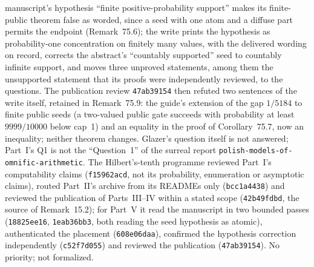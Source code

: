 \documentclass[11pt]{article}
\newcommand{\dir}[1]{\texttt{#1}}
\begin{document}
{manuscript's hypothesis ``finite positive-probability support'' makes its
finite-public theorem false as worded, since a seed with one atom and a
diffuse part permits the endpoint (Remark~75.6); the write prints the
hypothesis as probability-one concentration on finitely many values, with
the delivered wording on record, corrects the abstract's ``countably
supported'' seed to countably infinite support, and moves three unproved
statements, among them the unsupported statement that its proofs were
independently reviewed, to the questions.  The publication review \texttt{47ab39154} then refuted two
sentences of the write itself, retained in Remark~75.9: the guide's
extension of the gap $1/5184$ to finite public seeds (a two-valued public
gate succeeds with probability at least $9999/10000$ below cap~1) and an
equality in the proof of Corollary~75.7, now an inequality; neither
theorem changes.
Glazer's question itself is not answered; Part~I's Q1 is not the
``Question~1'' of the surreal report
\dir{polish-models-of-omnific-arithmetic}.  The Hilbert's-tenth programme
reviewed Part~I's computability claims (\texttt{f15962acd}, not its
probability, enumeration or asymptotic claims), routed Part~II's
archive from its READMEs only (\texttt{bcc1a4438}) and reviewed the
publication of Parts~III--IV within a stated scope (\texttt{42b49fdbd},
the source of Remark~15.2); for Part~V it read the manuscript in two
bounded passes (\texttt{18825ee16}, \texttt{1eab36bb3}, both reading the
seed hypothesis as atomic), authenticated the placement
(\texttt{608e06daa}), confirmed the hypothesis correction independently
(\texttt{c52f7d055}) and reviewed the publication (\texttt{47ab39154}).
No priority; not formalized.}
\end{document}
